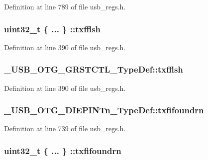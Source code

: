 Definition at line 789 of file usb\-\_\-regs.\-h.

\hypertarget{group___u_s_b___o_t_g___d_r_i_v_e_r_ga51e517e2f12133911a832d5aa3c9c2a8}{
\subsubsection[{txfflsh}]{\setlength{\rightskip}{0pt plus 5cm}uint32\-\_\-t \{ ... \} \-::txfflsh}}\label{group___u_s_b___o_t_g___d_r_i_v_e_r_ga51e517e2f12133911a832d5aa3c9c2a8}


Definition at line 390 of file usb\-\_\-regs.\-h.

\hypertarget{group___u_s_b___o_t_g___d_r_i_v_e_r_ga35e4fa074133fbed23d7c251825dc21f}{
\subsubsection[{txfflsh}]{ \-\_\-\-U\-S\-B\-\_\-\-O\-T\-G\-\_\-\-G\-R\-S\-T\-C\-T\-L\-\_\-\-Type\-Def\-::txfflsh}}\label{group___u_s_b___o_t_g___d_r_i_v_e_r_ga35e4fa074133fbed23d7c251825dc21f}


Definition at line 390 of file usb\-\_\-regs.\-h.

\hypertarget{group___u_s_b___o_t_g___d_r_i_v_e_r_ga158dce0a9dd3a9f996d4f1dc5e498c07}{
\subsubsection[{txfifoundrn}]{ \-\_\-\-U\-S\-B\-\_\-\-O\-T\-G\-\_\-\-D\-I\-E\-P\-I\-N\-Tn\-\_\-\-Type\-Def\-::txfifoundrn}}\label{group___u_s_b___o_t_g___d_r_i_v_e_r_ga158dce0a9dd3a9f996d4f1dc5e498c07}


Definition at line 739 of file usb\-\_\-regs.\-h.

\hypertarget{group___u_s_b___o_t_g___d_r_i_v_e_r_gadf10b52beb055974c44d9a1f5ba2135a}{
\subsubsection[{txfifoundrn}]{\setlength{\rightskip}{0pt plus 5cm}uint32\-\_\-t \{ ... \} \-::txfifoundrn}}\label{group___u_s_b___o_t_g___d_r_i_v_e_r_gadf10b52beb055974c44d9a1f5ba2135a}


